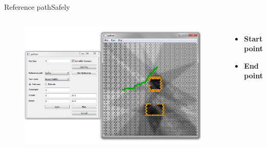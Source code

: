 \begin{frame}{Reference path}{Safely}

\begin{columns}
\begin{figure}
\centering
\includegraphics[width = \textwidth]{./screenshot/safely_reference_path.png}
\end{figure}

\begin{minipage}{\textwidth}
\begin{itemize}
\item \textbf{Start point}
\item \textbf{End point}
\end{itemize}
\end{minipage}
\end{columns}

\end{frame}

